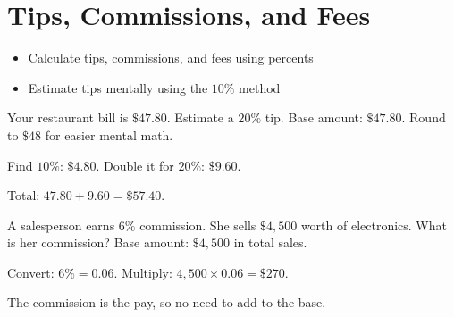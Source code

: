 \section{Tips, Commissions, and Fees}

\begin{stepGoal}
\begin{itemize}
    \item Calculate tips, commissions, and fees using percents
    \item Estimate tips mentally using the $10\%$ method
\end{itemize}
\end{stepGoal}

\begin{stepVocabBox}
\end{stepVocabBox}

\begin{stepsCard}
\end{stepsCard}

\begin{stepExample}{Your restaurant bill is $\$47.80$. Estimate a $20\%$ tip.}
     Base amount: $\$47.80$. Round to $\$48$ for easier mental math.

     Find $10\%$: $\$4.80$. Double it for $20\%$: $\$9.60$.

     Total: $47.80 + 9.60 = \$57.40$.
\end{stepExample}

\begin{stepExample}{A salesperson earns $6\%$ commission. She sells $\$4{,}500$ worth of electronics. What is her commission?}
     Base amount: $\$4{,}500$ in total sales.

     Convert: $6\% = 0.06$. Multiply: $4{,}500 \times 0.06 = \$270$.

     The commission is the pay, so no need to add to the base.
\end{stepExample}

